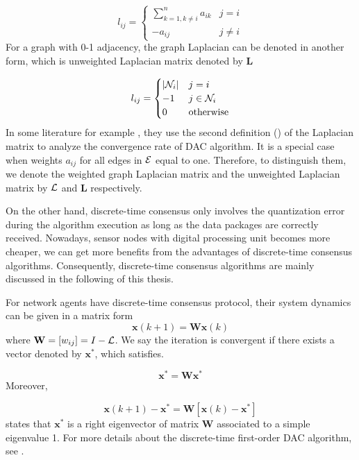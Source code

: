 \begin{equation}
l_{ij}=\begin{cases}
\sum_{k=1,k\neq i}^{n}a_{ik} & j=i\\
-a_{ij} & j\neq i
\end{cases}\label{eq:Graph Laplacian def.}
\end{equation}
For a graph with 0-1 adjacency, the graph Laplacian can be denoted
in another form, which is unweighted Laplacian matrix denoted by $\mathbf{L}$

\begin{equation}
l_{ij}=\begin{cases}
\left|{\cal N}_{i}\right| & j=i\\
-1 & j\in{\cal N}_{i}\\
0 & \mbox{otherwise}
\end{cases}\label{eq:Laplacian def.}
\end{equation}
In some literature for example \cite{Xiong2009a}, they use the second
definition () of the Laplacian matrix
to analyze the convergence rate of DAC algorithm. It is a special
case when weights $a_{ij}$ for all edges in ${\cal E}$ equal to
one. Therefore, to distinguish them, we denote the weighted graph
Laplacian matrix and the unweighted Laplacian matrix by ${\cal L}$
and $\mathbf{L}$ respectively. 

On the other hand, discrete-time consensus only involves the quantization
error during the algorithm execution as long as the data packages
are correctly received. Nowadays, sensor nodes with digital processing
unit becomes more cheaper, we can get more benefits from the advantages
of discrete-time consensus algorithms. Consequently, discrete-time
consensus algorithms are mainly discussed in the following of this
thesis. 

For network agents have discrete-time consensus protocol, their system
dynamics can be given in a matrix form
\begin{equation}
\mathbf{x}(k+1)=\mathbf{W}\mathbf{x}(k)
\end{equation}
where $\mathbf{W}=\left[w_{ij}\right]=I-{\cal L}$. We say the iteration
is convergent if there exists a vector denoted by $\mathbf{x}^{*}$,
which satisfies.

\begin{equation}
\mathbf{x}^{*}=\mathbf{W}\mathbf{x}^{*}\label{eq:stable state iteration}
\end{equation}
Moreover, 

\begin{equation}
\mathbf{x}(k+1)-\mathbf{x}^{*}=\mathbf{W}\left[\mathbf{x}(k)-\mathbf{x}^{*}\right]\label{eq:error vector iter. 1st}
\end{equation}
 states that $\mathbf{x}^{*}$
is a right eigenvector of matrix $\mathbf{W}$ associated to a simple
eigenvalue 1. For more details about the discrete-time first-order
DAC algorithm, see . 
